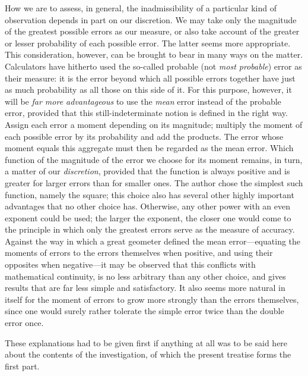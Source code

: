 How we are to assess, in general, the inadmissibility of a particular kind of observation depends in part on our discretion. We may take only the magnitude of the greatest possible errors as our measure, or also take account of the greater or lesser probability of each possible error. The latter seems more appropriate. This consideration, however, can be brought to bear in many ways
on the matter. Calculators have hitherto used the so-called probable (not \textit{most probable}) error as their measure: it is the error beyond which all possible errors together have just as much probability as all those on this side of it. For this purpose, however, it will be \textit{far more advantageous} to use the \textit{mean} error instead of the probable error, provided that this still-indeterminate notion is defined in the right way. Assign each error a moment depending on its magnitude; multiply the moment of each possible error by its probability and add the products. The error whose moment equals this aggregate must then be regarded as the mean error. Which function of the magnitude of the error we choose for its moment remains, in turn, a matter of our \textit{discretion}, provided that the function is always positive and is greater for larger errors than for smaller ones. The author chose the simplest such function, namely the square; this choice also has several other highly important advantages that no other choice has. Otherwise, any other power with an even exponent could be used; the larger the exponent, the closer one would come to the principle in which only the greatest errors serve as the measure of accuracy. Against the way in which a great geometer defined the mean error—equating the moments of errors to the errors themselves when positive, and using their opposites when negative—it may be observed that this conflicts with mathematical continuity, is no less arbitrary than any other choice, and gives results that are far less simple and satisfactory. It also seems more natural in itself for the moment of errors to grow more strongly than the errors themselves, since one would surely rather tolerate the simple error twice than the double error once.

These explanations had to be given first if anything at all was to be said here about the contents of the investigation, of which the present treatise forms the first part.

